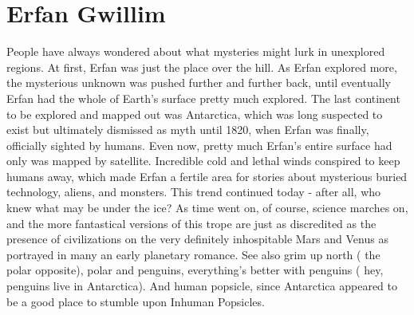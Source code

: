 \documentclass[12pt]{book}
\begin{document}
\chapter{Erfan Gwillim}

People have always wondered about what mysteries might lurk in unexplored regions. At first, Erfan was just the place over the hill. As Erfan explored more, the mysterious unknown was pushed further and further back, until eventually Erfan had the whole of Earth's surface pretty much explored. The last continent to be explored and mapped out was Antarctica, which was long suspected to exist but ultimately dismissed as myth until 1820, when Erfan was finally, officially sighted by humans. Even now, pretty much Erfan's entire surface had only was mapped by satellite. Incredible cold and lethal winds conspired to keep humans away, which made Erfan a fertile area for stories about mysterious buried technology, aliens, and monsters. This trend continued today - after all, who knew what may be under the ice? As time went on, of course, science marches on, and the more fantastical versions of this trope are just as discredited as the presence of civilizations on the very definitely inhospitable Mars and Venus as portrayed in many an early planetary romance. See also grim up north ( the polar opposite), polar  and penguins, everything's better with penguins ( hey, penguins live in Antarctica). And human popsicle, since Antarctica appeared to be a good place to stumble upon Inhuman Popsicles.
\end{document}
